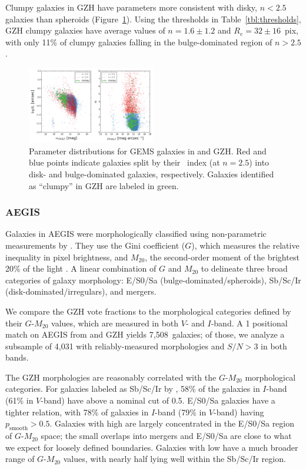 \documentclass[twocolumn]{aastex6}
\begin{document}
Clumpy galaxies in GZH have \galfit{} parameters more consistent with disky, $n<2.5$ galaxies than spheroids (Figure~\ref{fig:clumpy_gems}). Using the thresholds in Table~\ref{tbl:thresholds}, GZH clumpy galaxies have average values of $n=1.6\pm1.2$ and $R_e=32\pm16$~pix, with only 11\% of clumpy galaxies falling in the bulge-dominated region of $n>2.5$. 

\begin{figure}
\begin{center}
\includegraphics[width=0.50\textwidth]{figures/gems_clumpy.png}
\caption{Parameter distributions for GEMS galaxies in \citet{hau07} and GZH. Red and blue points indicate galaxies split by their \sersic~index (at $n=2.5$) into disk- and bulge-dominated galaxies, respectively. Galaxies identified as ``clumpy'' in GZH are labeled in green.}
\label{fig:clumpy_gems}
\end{center}
\end{figure}

\subsubsection{AEGIS}

Galaxies in AEGIS were morphologically classified using non-parametric measurements by \citet{lot08}. They use the Gini coefficient ($G$), which measures the relative inequality in pixel brightness, and $M_{20}$, the second-order moment of the brightest 20\% of the light \citep{lot04}. A linear combination of $G$ and $M_{20}$ to delineate three broad categories of galaxy morphology: E/S0/Sa (bulge-dominated/spheroids), Sb/Sc/Ir (disk-dominated/irregulars), and mergers.  

We compare the GZH vote fractions to the morphological categories defined by their $G$-$M_{20}$ values, which are measured in both $V$- and $I$-band. A 1\arcsec{} positional match on AEGIS from \citet{lot08} and GZH yields 7,508~galaxies; of those, we analyze a subsample of 4,031 with reliably-measured morphologies and $S/N>3$ in both bands. 

The GZH morphologies are reasonably correlated with the $G$-$M_{20}$ morphological categories. For galaxies labeled as Sb/Sc/Ir by \citet{lot08}, 58\% of the galaxies in $I$-band (61\% in $V$-band) have \pbest{} above a nominal cut of 0.5. E/S0/Sa galaxies have a tighter relation, with 78\% of galaxies in $I$-band (79\% in $V$-band) having $p_\mathrm{smooth}>0.5$. Galaxies with high \pbest{} are largely concentrated in the E/S0/Sa region of $G$-$M_{20}$ space; the small overlaps into mergers and E/S0/Sa are close to what we expect for loosely defined boundaries. Galaxies with low \pbest{} have a much broader range of $G$-$M_{20}$ values, with nearly half lying well within the Sb/Sc/Ir region. 
\end{document}
